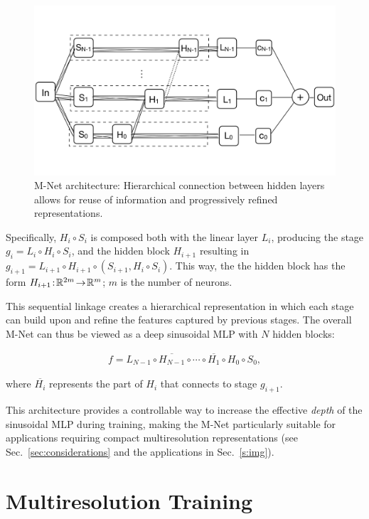 \begin{figure}[!h]
    \centering
    \includegraphics[width=0.75\linewidth]{img/ch4/mnet.pdf}
    \caption{M-Net architecture: Hierarchical connection between hidden layers allows for reuse of information and progressively refined representations.}
    \label{f:m-net}
\end{figure}
    
Specifically, $H_i\circ  S_i$ is composed both with the linear layer $L_i$, producing the stage $g_i\! =\! L_i\!\circ\! H_i\!\circ\!  S_i$, and the hidden block $H_{i+1}$ resulting in $g_{i+1}\! =\! L_{i+1}\!\circ H_{i+1}\!\circ\left(S_{i+1}, H_i\circ  S_i\right)$. This way, the the hidden block has the form $H_{i+1}\!:\!\mathbb{R}^{2m}\!\to\! \mathbb{R}^m$; $m$ is the number of neurons. 

This sequential linkage creates a hierarchical representation in which each stage can build upon and refine the features captured by previous stages. The overall M-Net can thus be viewed as a deep sinusoidal MLP with \( N \) hidden blocks:

\begin{align}
    f = L_{N-1} \circ \overline{H_{N-1}} \circ \cdots \circ \overline{H_1} \circ H_0 \circ S_0,
\end{align}

where \( \overline{H_i} \) represents the part of \( H_i \) that connects to stage \( g_{i+1} \).

This architecture provides a controllable way to increase the effective \textit{depth} of the sinusoidal MLP during training, making the M-Net particularly suitable for applications requiring compact multiresolution representations (see Sec.~\ref{sec:considerations} and the applications in Sec.~\ref{s:img}).



\section{Multiresolution Training}\label{sec:mr_training}
\label{s:training}

